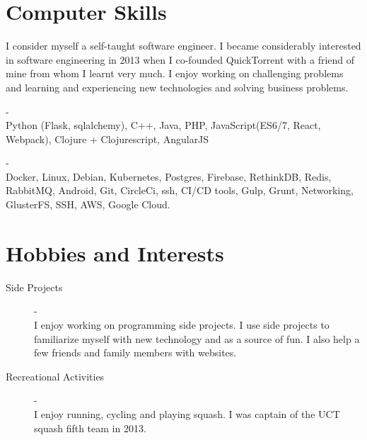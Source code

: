 \documentclass[margin,line,a4paper]{resume}
\begin{document}
\begin{resume}
        \section{\mysidestyle Computer Skills}
            \begin{description}
            	\item
	            	I consider myself a self-taught software engineer. I became considerably interested in software engineering in 2013 when I co-founded QuickTorrent with a friend of mine from whom I learnt very much. I enjoy working on challenging problems and learning and experiencing new technologies and solving business problems.
                \item [Programming, Scripting and Markup Languages] - \\
	                Python (Flask, sqlalchemy), C++, Java, PHP, JavaScript(ES6/7, React, Webpack), Clojure + Clojurescript, AngularJS
	            \item [Technologies] - \\
	            Docker, Linux, Debian, Kubernetes, Postgres, Firebase, RethinkDB, Redis, RabbitMQ, Android, Git, CircleCi, ssh, CI/CD tools, Gulp, Grunt, Networking, GlusterFS, SSH, AWS, Google Cloud.
            \end{description}
   
	    \section{\mysidestyle Hobbies and Interests}
		    \begin{description}
		    	\item [Side Projects] - \\
			    	I enjoy working on programming side projects. I use side projects to familiarize myself with new technology and as a source of fun.
			    	I also help a few friends and family members with websites.
			    
			    \item [Recreational Activities] - \\
					I enjoy running, cycling and playing squash.
					I was captain of the UCT squash fifth team in 2013.
		    	
		    \end{description}

    \end{resume}
\end{document}
